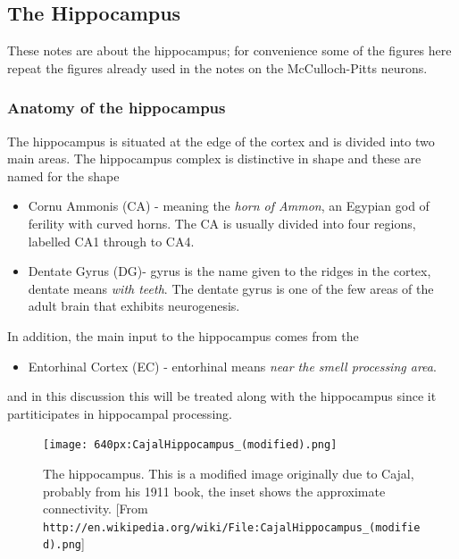 \documentclass[12pt]{article}
\begin{document}
\subsection*{The Hippocampus}
These notes are about the hippocampus; for convenience some of the
figures here repeat the figures already used in the notes on the
McCulloch-Pitts neurons.

\subsubsection*{Anatomy of the hippocampus}

The hippocampus is situated at the edge of the cortex and is divided
into two main areas. The hippocampus complex is distinctive in shape
and these are named for the shape
\begin{itemize}
\item Cornu Ammonis (CA) - meaning the \textsl{horn of Ammon}, an
  Egypian god of ferility with curved horns. The CA is usually divided
  into four regions, labelled CA1 through to CA4.
\item Dentate Gyrus (DG)- gyrus is the name given to the ridges in the
  cortex, dentate means \textsl{with teeth}. The dentate gyrus is one
  of the few areas of the adult brain that exhibits neurogenesis.
\end{itemize}
In addition, the main input to the hippocampus comes from the
\begin{itemize}
\item Entorhinal Cortex (EC) - entorhinal means \textsl{near the smell processing area}. 
\end{itemize}
and in this discussion this will be treated along with the hippocampus
since it partiticipates in hippocampal processing.

\begin{figure}
\begin{center}
\texttt{[image: 640px:CajalHippocampus\_(modified).png]}
\end{center}
\caption{The hippocampus. This is a modified image originally due to
  Cajal, probably from his 1911 book, the inset shows the approximate
  connectivity. [From
    \texttt{http://en.wikipedia.org/wiki/File:CajalHippocampus\_(modified).png}]\label{fig:hippocampus}}
\end{figure}
\end{document}

